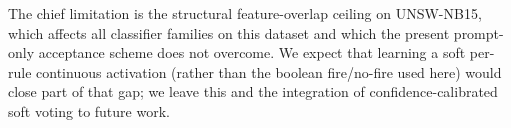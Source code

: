 The chief limitation is the structural feature-overlap ceiling on
UNSW-NB15, which affects all classifier families on this dataset and
which the present prompt-only acceptance scheme does not overcome. We
expect that learning a soft per-rule continuous activation (rather than
the boolean fire/no-fire used here) would close part of that gap; we
leave this and the integration of confidence-calibrated soft voting to
future work.
